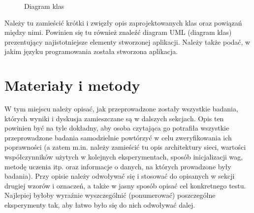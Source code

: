\documentclass{classrep}
\begin{document}
\begin{figure}[h!]
    \centering
    \caption{Diagram klas}
    \label{fig:uml}
\end{figure}



{\color{blue}
Należy tu zamieścić krótki i zwięzły opis zaprojektowanych klas oraz powiązań
między nimi. Powinien się tu również znaleźć diagram UML  (diagram klas)
prezentujący najistotniejsze elementy stworzonej aplikacji. Należy także
podać, w jakim języku programowania została stworzona aplikacja. }

\section{Materiały i metody}

{\color{blue}
W tym miejscu należy opisać, jak przeprowadzone zostały wszystkie badania,
których wyniki i dyskusja zamieszczane są w dalszych sekcjach. Opis ten
powinien być na tyle dokładny, aby osoba czytająca go potrafiła wszystkie
przeprowadzone badania samodzielnie powtórzyć w celu zweryfikowania ich
poprawności (a zatem m.in. należy zamieścić tu opis architektury sieci,
wartości współczynników użytych w kolejnych eksperymentach, sposób
inicjalizacji wag, metodę uczenia itp. oraz informacje o danych, na których
prowadzone były badania). Przy opisie należy odwoływać się i stosować do
opisanych w sekcji drugiej wzorów i oznaczeń, a także w jasny sposób opisać
cel konkretnego testu. Najlepiej byłoby wyraźnie wyszczególnić (ponumerować)
poszczególne eksperymenty tak, aby łatwo było się do nich odwoływać dalej.}
\end{document}
